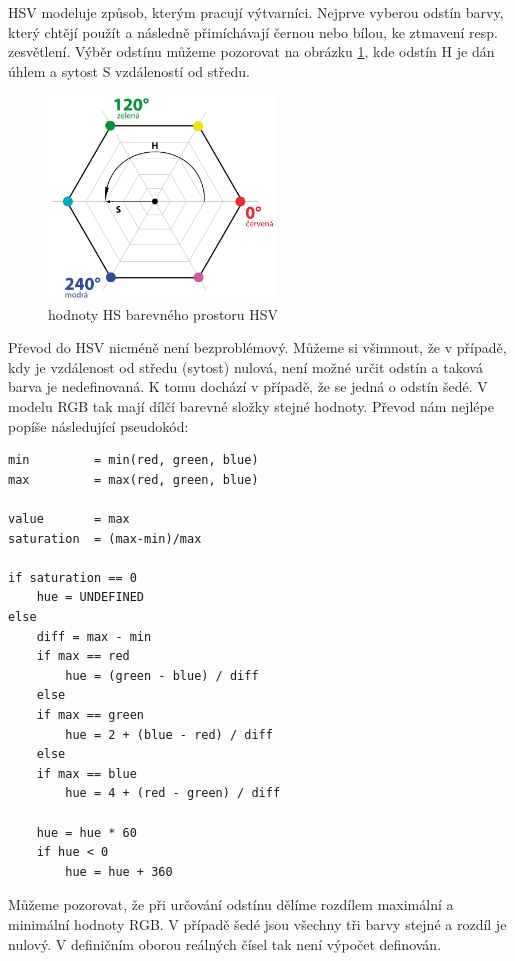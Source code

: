 \documentclass[11pt,twoside,a4paper]{book}
\begin{document}
\indent
HSV modeluje způsob, kterým pracují výtvarníci. Nejprve vyberou odstín barvy, který chtějí použít a následně přimíchávají černou nebo bílou, ke ztmavení resp. zesvětlení. Výběr odstínu můžeme pozorovat na obrázku \ref{fig:hsv}, kde odstín H je dán úhlem a sytost S vzdáleností od středu.

\begin{figure}[ht]
\begin{center}
\includegraphics[width=6cm]{figures/hsv}
\caption{hodnoty HS barevného prostoru HSV}
\label{fig:hsv}
\end{center}
\end{figure}

\indent
Převod do HSV nicméně není bezproblémový. Můžeme si všimnout, že v případě, kdy je vzdálenost od středu (sytost) nulová, není možné určit odstín a taková barva je nedefinovaná. K tomu dochází v případě, že se jedná o odstín šedé. V modelu RGB tak mají dílčí barevné složky stejné hodnoty. Převod nám nejlépe popíše následující pseudokód:

\begin{verbatim}
min         = min(red, green, blue)
max         = max(red, green, blue)

value       = max
saturation  = (max-min)/max

if saturation == 0
    hue = UNDEFINED
else
    diff = max - min
    if max == red
        hue = (green - blue) / diff
    else
    if max == green
        hue = 2 + (blue - red) / diff
    else
    if max == blue
        hue = 4 + (red - green) / diff

    hue = hue * 60
    if hue < 0
        hue = hue + 360
\end{verbatim}

\indent
Můžeme pozorovat, že při určování odstínu dělíme rozdílem maximální a minimální hodnoty RGB. V případě šedé jsou všechny tři barvy stejné a rozdíl je nulový. V definičním oborou reálných čísel tak není výpočet definován.
\end{document}
